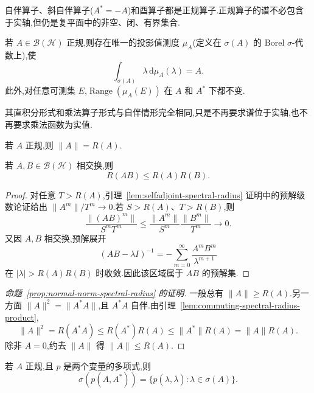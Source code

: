 自伴算子、斜自伴算子(\(A^{*}=-A\))和酉算子都是正规算子.正规算子的谱不必包含于实轴,但仍是复平面中的非空、闭、有界集合.

\begin{theorem}[正规算子的谱定理]\label{thm:bounded-normal-spectral}
若 \(A\in\mathcal{B}(\mathcal{H})\) 正规,则存在唯一的投影值测度 \(\mu_{A}\)(定义在 \(\sigma(A)\) 的 Borel \(\sigma\)-代数上),使
\[
\int_{\sigma(A)}\lambda\,\mathrm{d}\mu_{A}(\lambda)=A.
\]
此外,对任意可测集 \(E\),\(\operatorname{Range}(\mu_{A}(E))\) 在 \(A\) 和 \(A^{*}\) 下都不变.
\end{theorem}

其直积分形式和乘法算子形式与自伴情形完全相同,只是不再要求谱位于实轴,也不再要求乘法函数为实值.

\begin{proposition}[正规算子的范数等于谱半径]\label{prop:normal-norm-spectral-radius}
若 \(A\) 正规,则 \(\|A\|=R(A)\).
\end{proposition}

\begin{lemma}[可交换乘积的谱半径]\label{lem:commuting-spectral-radius-product}
若 \(A,B\in\mathcal{B}(\mathcal{H})\) 相交换,则
\[
R(AB)\leq R(A)R(B).
\]
\end{lemma}

\begin{proof}
对任意 \(T>R(A)\),引理~\ref{lem:selfadjoint-spectral-radius} 证明中的预解级数论证给出 \(\|A^{m}\|/T^{m}\to0\).若 \(S>R(A)\)、\(T>R(B)\),则
\[
\frac{\|(AB)^{m}\|}{S^{m}T^{m}}
\leq\frac{\|A^{m}\|}{S^{m}}\frac{\|B^{m}\|}{T^{m}}\to0.
\]
又因 \(A,B\) 相交换,预解展开
\[
(AB-\lambda I)^{-1}=-\sum_{m=0}^{\infty}\frac{A^{m}B^{m}}{\lambda^{m+1}}
\]
在 \(|\lambda|>R(A)R(B)\) 时收敛.因此该区域属于 \(AB\) 的预解集.
\end{proof}

\begin{proof}[命题~\ref{prop:normal-norm-spectral-radius} 的证明]
一般总有 \(\|A\|\geq R(A)\).另一方面 \(\|A\|^{2}=\|A^{*}A\|\),且 \(A^{*}A\) 自伴.由引理~\ref{lem:commuting-spectral-radius-product},
\[
\|A\|^{2}=R(A^{*}A)\leq R(A^{*})R(A)\leq\|A^{*}\|R(A)=\|A\|R(A).
\]
除非 \(A=0\),约去 \(\|A\|\) 得 \(\|A\|\leq R(A)\).
\end{proof}

\begin{theorem}[正规算子的多项式谱映射]\label{thm:normal-polynomial-spectral-mapping}
若 \(A\) 正规,且 \(p\) 是两个变量的多项式,则
\[
\sigma(p(A,A^{*}))
=\{p(\lambda,\overline\lambda):\lambda\in\sigma(A)\}.
\label{eq:normal-polynomial-spectral-mapping}
\]
\end{theorem}

